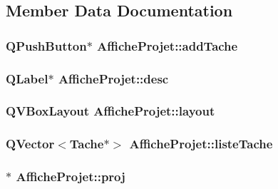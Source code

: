 \subsection{Member Data Documentation}
\hypertarget{class_affiche_projet_ac1789ddd1918a1b59929920ec55e4ea6}{}
\subsubsection[{add\+Tache}]{\setlength{\rightskip}{0pt plus 5cm}Q\+Push\+Button$\ast$ Affiche\+Projet\+::add\+Tache}\label{class_affiche_projet_ac1789ddd1918a1b59929920ec55e4ea6}
\hypertarget{class_affiche_projet_a1f045e44347cb1c7dcac4574ac6cc659}{}
\subsubsection[{desc}]{\setlength{\rightskip}{0pt plus 5cm}Q\+Label$\ast$ Affiche\+Projet\+::desc}\label{class_affiche_projet_a1f045e44347cb1c7dcac4574ac6cc659}
\hypertarget{class_affiche_projet_aeb93cb09a342e264154441f0cddfdad6}{}
\subsubsection[{layout}]{\setlength{\rightskip}{0pt plus 5cm}Q\+V\+Box\+Layout Affiche\+Projet\+::layout}\label{class_affiche_projet_aeb93cb09a342e264154441f0cddfdad6}
\hypertarget{class_affiche_projet_ac6269d456e34393394b0bfced3c88ec2}{}
\subsubsection[{liste\+Tache}]{\setlength{\rightskip}{0pt plus 5cm}Q\+Vector$<${\bf Tache}$\ast$$>$ Affiche\+Projet\+::liste\+Tache}\label{class_affiche_projet_ac6269d456e34393394b0bfced3c88ec2}
\hypertarget{class_affiche_projet_ac4a83778b0cfb7813b198cd35aafb404}{}
\subsubsection[{proj}]{$\ast$ Affiche\+Projet\+::proj}\label{class_affiche_projet_ac4a83778b0cfb7813b198cd35aafb404}
\hypertarget{class_affiche_projet_a98651088ef2e830bd134fce0b5122873}{}
